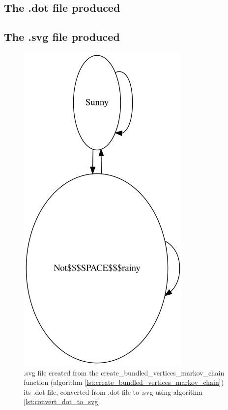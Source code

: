 

\subsection{The .dot file produced}



\subsection{The .svg file produced}

\begin{figure}[!htbp]
  \includegraphics[]{create_bundled_vertices_markov_chain.png}
  \caption{
    .svg file created from the create\_bundled\_vertices\_markov\_chain function
    (algorithm \ref{lst:create_bundled_vertices_markov_chain}) 
    its .dot file, converted from .dot file to .svg 
    using algorithm \ref{lst:convert_dot_to_svg}
  }
  \label{fig:create_bundled_vertices_markov_chain.svg}
\end{figure}

